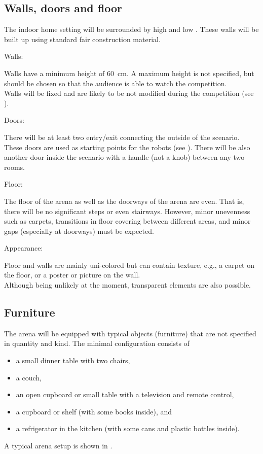 \subsection{Walls, doors and floor}\label{rule:scenario_walls}

The indoor home setting will be surrounded by high and low .
These walls will be built up using standard fair construction material.

\begin{enumerate}
{\bf\item Walls:} Walls have a minimum height of \SI{60}{\centi\meter}.
  A maximum height is not specified, but should be chosen so that the audience is able to watch the competition.\\
  Walls will be fixed and are likely to be not modified during the competition (see ). 
{\bf\item Doors:} There will be at least two entry/exit  connecting the outside of the scenario.
  These doors are used as starting points for the robots (see ).
  There will be also another door inside the scenario with a handle (not a knob) between any two rooms.
{\bf\item Floor:} The floor of the arena as well as the doorways of the arena are even.
  That is, there will be no significant steps or even stairways. 
  However, minor unevenness such as carpets, transitions in floor covering between different areas, 
  and minor gaps (especially at doorways) must be expected.
{\bf\item Appearance:} Floor and walls are mainly uni-colored but can 
  contain texture, e.g., a carpet on the floor, or a poster or picture 
  on the wall.\\
  Although being unlikely at the moment, transparent elements are also possible. 
\end{enumerate}


\subsection{Furniture}\label{rule:scenario_furniture}

The arena will be equipped with typical objects (furniture) that are
not specified in quantity and kind. 
The minimal configuration consists of 
\begin{itemize}
\item a small dinner table with two chairs, 
\item a couch, 
\item an open cupboard or small table with a television and remote control, 
\item a cupboard or shelf (with some books inside), and
\item a refrigerator in the kitchen (with some cans and plastic bottles inside). 
\end{itemize}
A typical arena setup is shown in .

